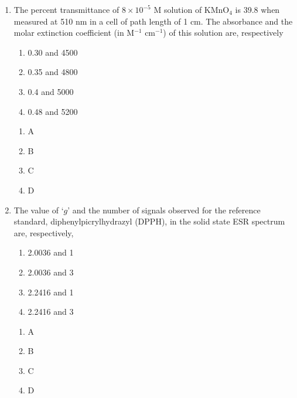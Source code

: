 \documentclass[journal,12pt,onecolumn]{exam}
\theoremstyle{remark}
\newcommand{\correct}{\textcolor{correctgreen}{\checkmark}}
\newcommand{\wrong}{\textcolor{wrongred}{\ding{55}}} %
\begin{document}
\begin{enumerate}
\item 
The percent transmittance of $8 \times 10^{-5}$ M solution of KMnO$_4$ is 39.8 when measured at 510 nm in a cell of path length of 1 cm. The absorbance and the molar extinction coefficient (in M$^{-1}$ cm$^{-1}$) of this solution are, respectively

\begin{enumerate}
    \item 0.30 and 4500
    \item 0.35 and 4800
    \item 0.4 and 5000
    \item 0.48 and 5200
\end{enumerate}

\hfill{}

\begin{multicols}{2}
\begin{enumerate}
    \item \wrong A
    \item \wrong B
    \item \wrong C
    \item \correct D
\end{enumerate}
\end{multicols}




\item 
The value of ‘$g$’ and the number of signals observed for the reference standard, diphenylpicrylhydrazyl (DPPH), in the solid state ESR spectrum are, respectively,

\begin{enumerate}
    \item 2.0036 and 1
    \item 2.0036 and 3
    \item 2.2416 and 1
    \item 2.2416 and 3
\end{enumerate}

\hfill{}

\begin{multicols}{2}
\begin{enumerate}[leftmargin=*, align=left]
    \item \correct A
    \item \wrong B
    \item \wrong C
    \item \wrong D
\end{enumerate}
\end{multicols}



\end{enumerate}
\end{document}
